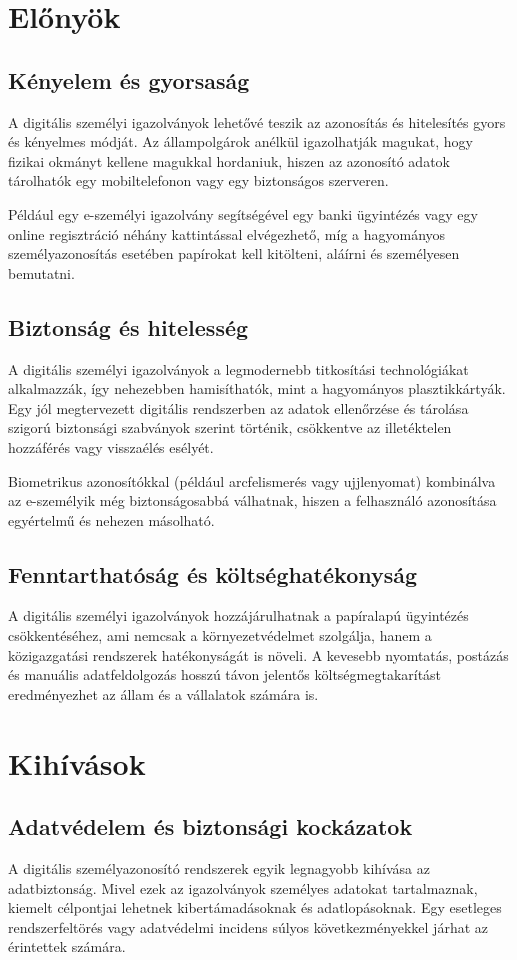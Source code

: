 \documentclass[
]{thesis-ekf}
\theoremstyle{definition}
\theoremstyle{remark}
\begin{document}
	\section{Előnyök}
	\subsection{Kényelem és gyorsaság}
	A digitális személyi igazolványok lehetővé teszik az azonosítás és hitelesítés gyors és kényelmes módját. Az állampolgárok anélkül igazolhatják magukat, hogy fizikai okmányt kellene magukkal hordaniuk, hiszen az azonosító adatok tárolhatók egy mobiltelefonon vagy egy biztonságos szerveren.
	
	Például egy e-személyi igazolvány segítségével egy banki ügyintézés vagy egy online regisztráció néhány kattintással elvégezhető, míg a hagyományos személyazonosítás esetében papírokat kell kitölteni, aláírni és személyesen bemutatni.
	\subsection{Biztonság és hitelesség}
	A digitális személyi igazolványok a legmodernebb titkosítási technológiákat alkalmazzák, így nehezebben hamisíthatók, mint a hagyományos plasztikkártyák. Egy jól megtervezett digitális rendszerben az adatok ellenőrzése és tárolása szigorú biztonsági szabványok szerint történik, csökkentve az illetéktelen hozzáférés vagy visszaélés esélyét.
	
	Biometrikus azonosítókkal (például arcfelismerés vagy ujjlenyomat) kombinálva az e-személyik még biztonságosabbá válhatnak, hiszen a felhasználó azonosítása egyértelmű és nehezen másolható.
	\subsection{Fenntarthatóság és költséghatékonyság}
	A digitális személyi igazolványok hozzájárulhatnak a papíralapú ügyintézés csökkentéséhez, ami nemcsak a környezetvédelmet szolgálja, hanem a közigazgatási rendszerek hatékonyságát is növeli. A kevesebb nyomtatás, postázás és manuális adatfeldolgozás hosszú távon jelentős költségmegtakarítást eredményezhet az állam és a vállalatok számára is.
	\section{Kihívások}
	\subsection{Adatvédelem és biztonsági kockázatok}
	A digitális személyazonosító rendszerek egyik legnagyobb kihívása az adatbiztonság. Mivel ezek az igazolványok személyes adatokat tartalmaznak, kiemelt célpontjai lehetnek kibertámadásoknak és adatlopásoknak. Egy esetleges rendszerfeltörés vagy adatvédelmi incidens súlyos következményekkel járhat az érintettek számára.
	
\end{document}
